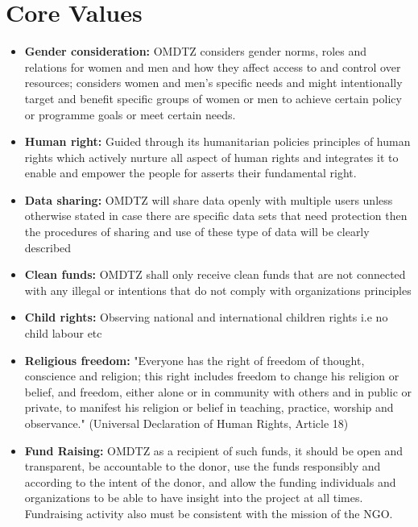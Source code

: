 \documentclass[a4paper,12pt,twoside]{article}
\begin{document}
\section{Core Values}
\label{corevalues}
\begin{itemize}

\item \textbf{Gender consideration:} OMDTZ considers gender norms, roles and relations for women and men and how they affect access to and control over resources; considers women and men's specific needs and might intentionally target and benefit specific groups of women or men to achieve certain policy or programme goals or meet certain needs.

\item \textbf{Human right:} Guided through its humanitarian policies principles of human rights which actively nurture all aspect of human rights and integrates it to enable and empower the people for asserts their fundamental right.

\item \textbf{Data sharing:}  OMDTZ  will share data openly with multiple users unless otherwise stated in case there are specific data sets that need protection then the procedures of sharing and use of these type of data will be clearly described

\item\textbf{Clean funds:}  OMDTZ shall only receive clean funds that are not connected with any illegal or intentions that do not comply with organizations principles

\item\textbf{Child rights:} Observing national and international children rights i.e no child labour etc

\item \textbf{Religious freedom:} "Everyone has the right of freedom of thought, conscience and religion; this right includes freedom to change his religion or belief, and freedom, either alone or in community with others and in public or private, to manifest his religion or belief in teaching, practice, worship and observance." (Universal Declaration of Human Rights, Article 18)

\item\textbf{Fund Raising: }OMDTZ as a recipient of such funds, it should be open and transparent, be accountable to the donor, use the funds responsibly and according to the intent of the donor, and allow the funding individuals and organizations to be able to have insight into the project at all times. Fundraising activity also must be consistent with the mission of the NGO.
\end{itemize}
\end{document}
